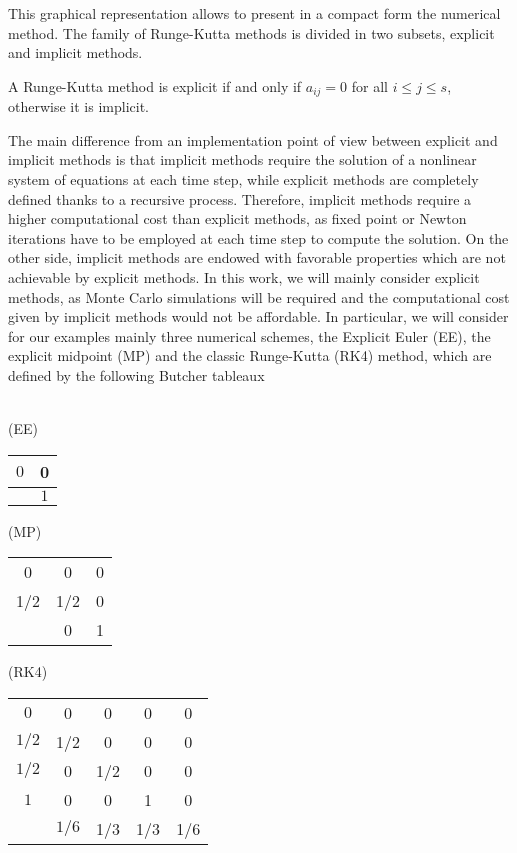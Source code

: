 This graphical representation allows to present in a compact form the numerical method. The family of Runge-Kutta methods is divided in two subsets, explicit and implicit methods.
\begin{definition} A Runge-Kutta method is explicit if and only if $a_{ij} = 0$ for all $i \leq j \leq s$, otherwise it is implicit. 
\end{definition}
\noindent The main difference from an implementation point of view between explicit and implicit methods is that implicit methods require the solution of a nonlinear system of equations at each time step, while explicit methods are completely defined thanks to a recursive process. Therefore, implicit methods require a higher computational cost than explicit methods, as fixed point or Newton iterations have to be employed at each time step to compute the solution. On the other side, implicit methods are endowed with favorable properties which are not achievable by explicit methods. In this work, we will mainly consider explicit methods, as Monte Carlo simulations will be required and the computational cost given by implicit methods would not be affordable. In particular, we will consider for our examples mainly three numerical schemes, the Explicit Euler (EE), the explicit midpoint (MP) and the classic Runge-Kutta (RK4) method, which are defined by the following Butcher tableaux \\ \\
\begin{minipage}{0.2\linewidth} 
	\begin{center}
		(EE)
		\begin{tabular}{c|c}
			$0$ & 0 \\
			\hline 
			&$1$ 
		\end{tabular}
	\end{center}
\end{minipage}
\begin{minipage}{0.3\linewidth} 
	\begin{center}
		(MP)
		\begin{tabular}{c|cc}
			0 & 0 & 0 \\
			1/2 & 1/2 & 0 \\
			\hline 
			& 0 & 1 
		\end{tabular}
	\end{center}
\end{minipage}
\begin{minipage}{0.5\linewidth} 
	\begin{center}
		(RK4)
		\begin{tabular}{c|cccc}
			$0$ & 0 & 0 & 0 & 0\\
			$1/2$ & 1/2 & 0 & 0 & 0\\
			$1/2$ & 0 & 1/2 & 0 & 0\\
			$1$ & 0 & 0 & 1 & 0\\
			\hline 
			&$1/6$ & 1/3 & 1/3 & 1/6
		\end{tabular}
	\end{center}
\end{minipage} \\ \\
